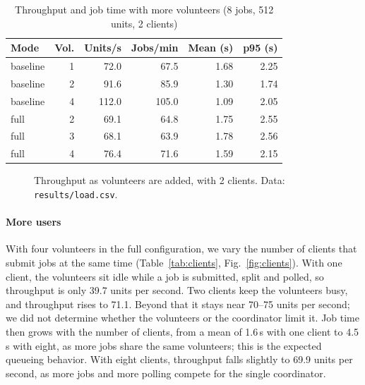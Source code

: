 \begin{table}[t]
\centering
\caption{Throughput and job time with more volunteers (8 jobs, 512 units, 2 clients)}
\label{tab:load}
\begin{tabular}{@{}lrrrrr@{}}
\toprule
Mode & Vol. & Units/s & Jobs/min & Mean (s) & p95 (s) \\
\midrule
baseline & 1 & 72.0 & 67.5 & 1.68 & 2.25 \\
baseline & 2 & 91.6 & 85.9 & 1.30 & 1.74 \\
baseline & 4 & 112.0 & 105.0 & 1.09 & 2.05 \\
full & 2 & 69.1 & 64.8 & 1.75 & 2.55 \\
full & 3 & 68.1 & 63.9 & 1.78 & 2.56 \\
full & 4 & 76.4 & 71.6 & 1.59 & 2.15 \\
\bottomrule
\end{tabular}
\end{table}

\begin{figure}[t]
\centering
{}
\caption{Throughput as volunteers are added, with 2 clients. Data: \texttt{results/load.csv}.}
\label{fig:load}
\end{figure}

\paragraph{More users}
With four volunteers in the full configuration, we vary the number of clients that submit jobs at the same time (Table~\ref{tab:clients}, Fig.~\ref{fig:clients}). With one client, the volunteers sit idle while a job is submitted, split and polled, so throughput is only 39.7 units per second. Two clients keep the volunteers busy, and throughput rises to 71.1. Beyond that it stays near 70--75 units per second; we did not determine whether the volunteers or the coordinator limit it. Job time then grows with the number of clients, from a mean of 1.6\,s with one client to 4.5\,s with eight, as more jobs share the same volunteers; this is the expected queueing behavior. With eight clients, throughput falls slightly to 69.9 units per second, as more jobs and more polling compete for the single coordinator.

